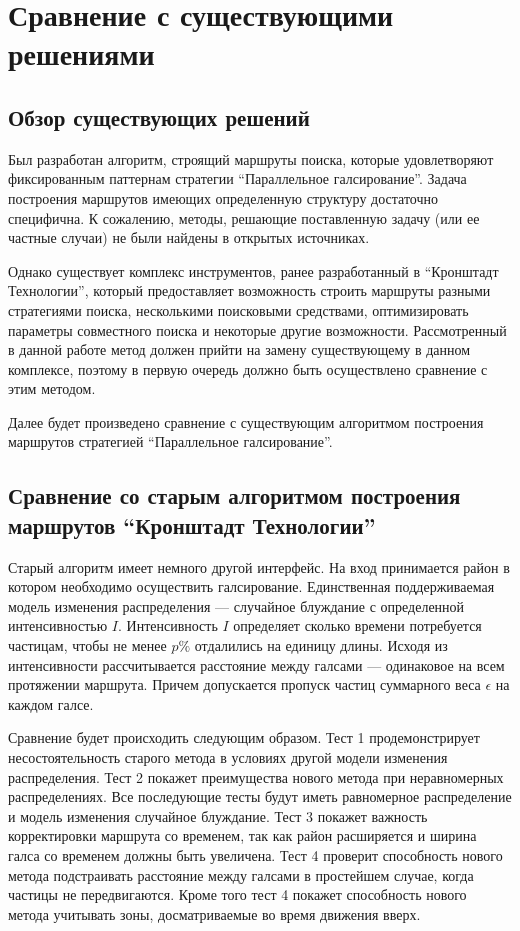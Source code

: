 \chapter{Сравнение с существующими решениями}
\section{Обзор существующих решений}
Был разработан алгоритм, строящий маршруты поиска, которые удовлетворяют фиксированным паттернам
стратегии ``Параллельное галсирование''. Задача построения маршрутов имеющих определенную
структуру достаточно специфична. К сожалению, методы, решающие поставленную задачу (или
ее частные случаи) не были найдены в открытых источниках.

 Однако существует комплекс инструментов, ранее разработанный в ``Кронштадт Технологии'',
который предоставляет возможность строить маршруты разными стратегиями поиска, несколькими
поисковыми средствами, оптимизировать параметры совместного поиска и некоторые другие возможности.
Рассмотренный в данной работе метод должен прийти на замену существующему в данном комплексе,
поэтому в первую очередь должно быть осуществлено сравнение с этим методом.

Далее будет произведено сравнение с существующим алгоритмом построения маршрутов стратегией
``Параллельное галсирование''.

\FloatBarrier
\section{Сравнение со старым алгоритмом построения маршрутов ``Кронштадт Технологии''}
Старый алгоритм имеет немного другой интерфейс. На вход принимается район в котором необходимо
осуществить галсирование. Единственная поддерживаемая модель изменения распределения ---
случайное блуждание с определенной интенсивностью $I$. Интенсивность $I$ определяет сколько
времени потребуется частицам, чтобы не менее $p\%$ отдалились на единицу длины. Исходя из
интенсивности рассчитывается расстояние между галсами --- одинаковое на всем протяжении маршрута.
Причем допускается пропуск частиц суммарного веса $\epsilon$ на каждом галсе.

Сравнение будет происходить следующим образом. Тест 1 продемонстрирует несостоятельность старого
метода в условиях другой модели изменения распределения. Тест 2 покажет преимущества нового метода
при неравномерных распределениях. Все последующие тесты будут иметь равномерное распределение
и модель изменения случайное блуждание. Тест 3 покажет важность корректировки маршрута со
временем, так как район расширяется и ширина галса со временем должны быть увеличена.
Тест 4 проверит способность нового метода подстраивать расстояние между галсами в простейшем случае,
когда частицы не передвигаются. Кроме того тест 4 покажет способность нового метода учитывать зоны,
досматриваемые во время движения вверх.


